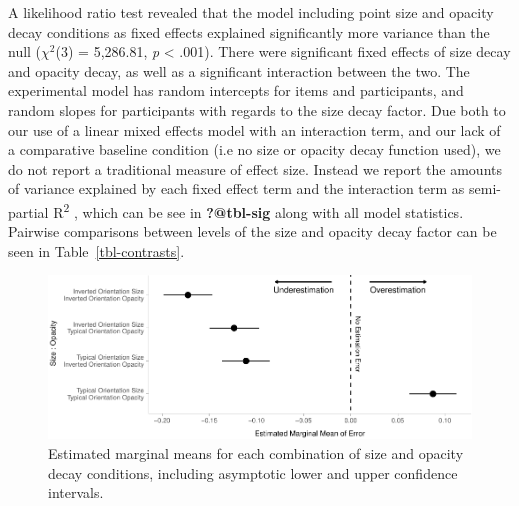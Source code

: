\documentclass[sigconf]{acmart}
\begin{document}
A likelihood ratio test revealed that the model including point size and
opacity decay conditions as fixed effects explained significantly more
variance than the null (\(\chi^2\)(3) = 5,286.81, \emph{p} \textless{}
.001). There were significant fixed effects of size decay and opacity
decay, as well as a significant interaction between the two. The
experimental model has random intercepts for items and participants, and
random slopes for participants with regards to the size decay factor.
Due both to our use of a linear mixed effects model with an interaction
term, and our lack of a comparative baseline condition (i.e no size or
opacity decay function used), we do not report a traditional measure of
effect size. Instead we report the amounts of variance explained by each
fixed effect term and the interaction term as semi-partial
R\textsuperscript{2} \citep{nakagawa_2013}, which can be see in
\textbf{?@tbl-sig} along with all model statistics. Pairwise comparisons
between levels of the size and opacity decay factor can be seen in
Table~\ref{tbl-contrasts}.

\begin{figure}

{\centering \includegraphics[width=1\textwidth,height=\textheight]{size_and_opacity_files/figure-pdf/fig-emm-plot-1.pdf}

}

\caption{\label{fig-emm-plot}Estimated marginal means for each
combination of size and opacity decay conditions, including asymptotic
lower and upper confidence intervals.}

\end{figure}
\end{document}

